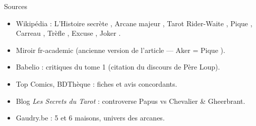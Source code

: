 \documentclass[11pt]{beamer}
\begin{document}
\begin{frame}{Sources}
\small
\begin{itemize}
\item Wikipédia : \og L'Histoire secrète \fg{}, \og Arcane majeur \fg{},
\og Tarot Rider-Waite \fg{}, \og Pique \fg{}, \og Carreau \fg{},
\og Trèfle \fg{}, \og Excuse \fg{}, \og Joker \fg{}.
\item Miroir fr-academic (ancienne version de l'article --- \og Aker = Pique \fg{}).
\item Babelio : critiques du tome 1 (citation du discours de Père Loup).
\item Top Comics, BDThèque : fiches et avis concordants.
\item Blog \emph{Les Secrets du Tarot} : controverse Papus vs Chevalier \& Gheerbrant.
\item Gaudry.be : 5\ieme{} et 6\ieme{} maisons, univers des arcanes.
\end{itemize}
\end{frame}
\end{document}
